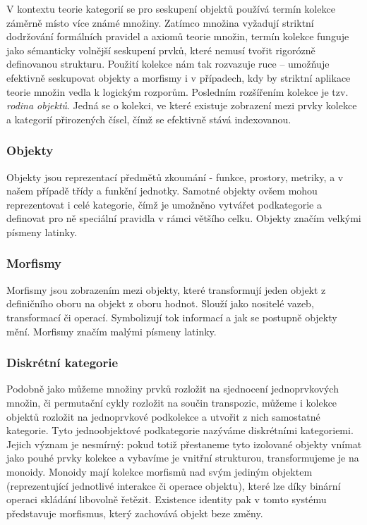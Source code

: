 \documentclass[FM,DP,fonts]{tulthesis}
\begin{document}
V kontextu teorie kategorií se pro seskupení objektů používá termín kolekce záměrně místo více známé množiny. Zatímco množina vyžadují striktní dodržování formálních pravidel a axiomů teorie množin, termín kolekce funguje jako sémanticky volnější seskupení prvků, které nemusí tvořit rigorózně definovanou strukturu. Použití kolekce nám tak rozvazuje ruce – umožňuje efektivně seskupovat objekty a morfismy i v případech, kdy by striktní aplikace teorie množin vedla k logickým rozporům. Posledním rozšířením kolekce je tzv. \textit{rodina objektů}. Jedná se o kolekci, ve které existuje zobrazení mezi prvky kolekce a kategorií přirozených čísel, čímž se efektivně stává indexovanou. \parencite{racket-category}

\subsubsection{Objekty}
Objekty jsou reprezentací předmětů zkoumání - funkce, prostory, metriky, a v našem případě třídy a funkční jednotky. Samotné objekty ovšem mohou reprezentovat i celé kategorie, čímž je umožněno vytvářet podkategorie a definovat pro ně speciální pravidla v rámci většího celku. Objekty značím velkými písmeny latinky. \parencite{racket-category}

\subsubsection{Morfismy}
Morfismy jsou zobrazením mezi objekty, které transformují jeden objekt z definičního oboru na objekt z oboru hodnot. Slouží jako nositelé vazeb, transformací či operací. Symbolizují tok informací a jak se postupně objekty mění. Morfismy značím malými písmeny latinky.  \parencite{racket-category}

\subsubsection{Diskrétní kategorie}
Podobně jako můžeme množiny prvků rozložit na sjednocení jednoprvkových množin, či permutační cykly rozložit na součin transpozic, můžeme i kolekce objektů rozložit na jednoprvkové podkolekce a utvořit z nich samostatné kategorie. Tyto jednoobjektové podkategorie nazýváme diskrétními kategoriemi. Jejich význam je nesmírný: pokud totiž přestaneme tyto izolované objekty vnímat jako pouhé prvky kolekce a vybavíme je vnitřní strukturou, transformujeme je na monoidy. Monoidy mají kolekce morfismů nad svým jediným objektem (reprezentující jednotlivé interakce či operace objektu), které lze díky binární operaci skládání libovolně řetězit. Existence identity pak v tomto systému představuje morfismus, který zachovává objekt beze změny. \parencite{racket-category}
\end{document}
